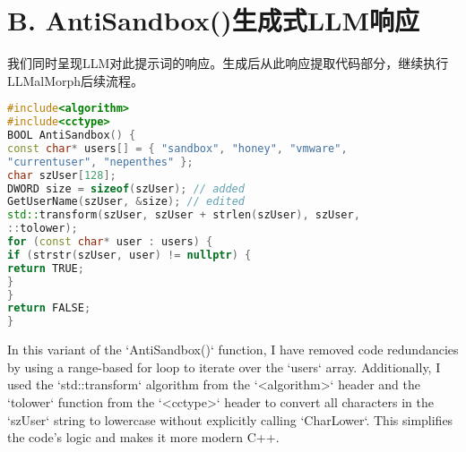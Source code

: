 \section{B. AntiSandbox()生成式LLM响应}
我们同时呈现LLM对此提示词的响应。生成后从此响应提取代码部分，继续执行LLMalMorph后续流程。

\begin{lstlisting}[language=C++, caption={LLM 生成的 AntiSandbox() 响应}, label={lst:code2}]
#include<algorithm>
#include<cctype>
BOOL AntiSandbox() {
const char* users[] = { "sandbox", "honey", "vmware",
"currentuser", "nepenthes" };
char szUser[128];
DWORD size = sizeof(szUser); // added
GetUserName(szUser, &size); // edited
std::transform(szUser, szUser + strlen(szUser), szUser,
::tolower);
for (const char* user : users) {
if (strstr(szUser, user) != nullptr) {
return TRUE;
}
}
return FALSE;
}
\end{lstlisting}

In this variant of the ‘AntiSandbox()‘ function, I have removed code redundancies by using a range-based for loop to iterate over the ‘users‘ array. Additionally, I used the ‘std::transform‘ algorithm from the ‘<algorithm>‘ header and the ‘tolower‘ function from the ‘<cctype>‘ header to convert all characters in the ‘szUser‘ string to lowercase without explicitly calling ‘CharLower‘. This simplifies the code’s logic and makes it more modern C++.